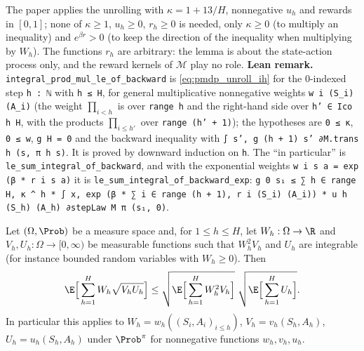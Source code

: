 \begin{remark}[Hypotheses]\label{rem:pmdp_unroll_hypotheses}
The paper applies the unrolling with $\kappa = 1 + 13/H$, nonnegative $u_h$ and rewards in
$[0, 1]$; none of $\kappa \ge 1$, $u_h \ge 0$, $r_h \ge 0$ is needed, only $\kappa \ge 0$ (to
multiply an inequality) and $e^{\beta r} > 0$ (to keep the direction of the inequality when
multiplying by $W_h$). The functions $r_h$ are arbitrary: the lemma is about the state-action
process only, and the reward kernels of $\mathcal M$ play no role. \textbf{Lean remark.}
\texttt{integral\_prod\_mul\_le\_of\_backward} is \eqref{eq:pmdp_unroll_ih} for the $0$-indexed
step \texttt{h : ℕ} with \texttt{h ≤ H}, for general multiplicative nonnegative weights
\texttt{w i (S\_i) (A\_i)} (the weight $\prod_{i < h}$ is over \texttt{range h} and the right-hand
side over \texttt{h' ∈ Ico h H}, with the products $\prod_{i \le h'}$ over \texttt{range (h' + 1)}); the
hypotheses are \texttt{0 ≤ κ}, \texttt{0 ≤ w}, \texttt{g H = 0} and the backward inequality with
\texttt{∫ s', g (h + 1) s' ∂M.trans h (s, π h s)}. It is proved by downward induction on
\texttt{h}. The ``in particular'' is \texttt{le\_sum\_integral\_of\_backward}, and with the
exponential weights \texttt{w i s a = exp (β * r i s a)} it is
\texttt{le\_sum\_integral\_of\_backward\_exp}:
\texttt{g 0 s₁ ≤ ∑ h ∈ range H, κ \^{} h * ∫ x, exp (β * ∑ i ∈ range (h + 1), r i (S\_i) (A\_i)) * u h (S\_h) (A\_h) ∂stepLaw M π (s₁, 0)}.
\end{remark}

\begin{lemma}\label{lem:cauchy_schwarz_traj}
\leanok
Let $(\Omega, \Prob)$ be a measure space and, for $1 \le h \le H$, let
$W_h : \Omega \to \R$ and $V_h, U_h : \Omega \to [0, \infty)$ be measurable functions such that
$W_h^2 V_h$ and $U_h$ are integrable (for instance bounded random variables with $W_h \ge 0$). Then
\[
  \E\Big[\sum_{h = 1}^H W_h\sqrt{V_h U_h}\Big]
  \le \sqrt{\E\Big[\sum_{h=1}^H W_h^2 V_h\Big]}\;\sqrt{\E\Big[\sum_{h=1}^H U_h\Big]} .
\]
In particular this applies to $W_h = w_h((S_i, A_i)_{i \le h})$, $V_h = v_h(S_h, A_h)$,
$U_h = u_h(S_h, A_h)$ under $\Prob^\pi$ for nonnegative functions $w_h, v_h, u_h$.
\end{lemma}


